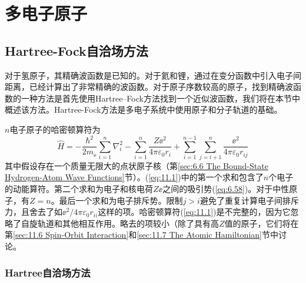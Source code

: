\chapter{多电子原子}
\label{chap:11}
\section{Hartree-Fock自洽场方法}
\label{sec:11.1 The Hartree-Fock Self-Consistent-Field Method}

    对于氢原子，其精确波函数是已知的。对于氦和锂，通过在变分函数中引入电子间距离，已经计算出了非常精确的波函数。对于原子序数较高的原子，找到精确波函数的一种方法是首先使用Hartree–Fock方法找到一个近似波函数，我们将在本节中概述该方法。Hartree-Fock方法是多电子系统中使用原子和分子轨道的基础。

    $n$电子原子的哈密顿算符为
    \begin{equation}
        \hat{H} = -\frac{\hbar^2}{2m_{\ee }} \sum_{i=1}^{n} \nabla_i^2 - \sum_{i=1}^{n} \frac{Z \ee ^2}{4\pi\varepsilon_0 r_i} + \sum_{i=1}^{n-1} \sum_{j=i+1}^{n} \frac{\ee ^2}{4\pi\varepsilon_0 r_{ij}}
        \label{eq:11.1}
    \end{equation}
    其中假设存在一个质量无限大的点状原子核（第\ref{sec:6.6 The Bound-State Hydrogen-Atom Wave Functions}节）。(\ref{eq:11.1})中的第一个求和包含了$n$个电子的动能算符。第二个求和为电子和核电荷$Z\ee $之间的吸引势(\ref{eq:6.58})。对于中性原子，有$Z=n$。最后一个求和为电子排斥势。限制$j > i$避免了重复计算电子间排斥力，且舍去了如$\ee ^2/4\pi\varepsilon_0 r_{ii}$这样的项。哈密顿算符(\ref{eq:11.1})是不完整的，因为它忽略了自旋轨道和其他相互作用。略去的项较小（除了具有高$Z$值的原子，它们将在第\ref{sec:11.6 Spin-Orbit Interaction}和\ref{sec:11.7 The Atomic Hamiltonian}节中讨论。

\subsection*{Hartree自洽场方法}

